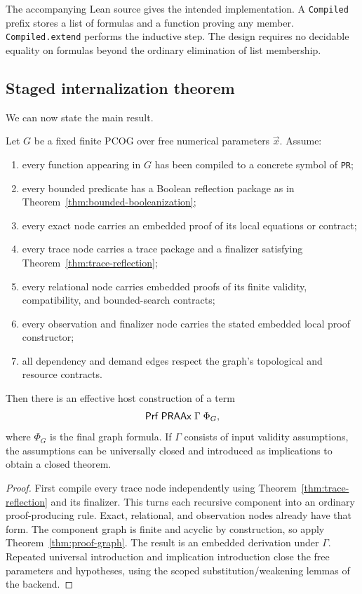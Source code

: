 The accompanying Lean source gives the intended implementation.  A
\texttt{Compiled} prefix stores a list of formulas and a function proving any
member.  \texttt{Compiled.extend} performs the inductive step.  The design
requires no decidable equality on formulas beyond the ordinary elimination of
list membership.

\subsection{Staged internalization theorem}

We can now state the main result.

\begin{theorem}
\label{thm:staged-internalization}
Let \(G\) be a fixed finite PCOG over free numerical parameters \(\vec x\).
Assume:
\begin{enumerate}
\item every function appearing in \(G\) has been compiled to a concrete
symbol of \texttt{PR};
\item every bounded predicate has a Boolean reflection package as in
Theorem~\ref{thm:bounded-booleanization};
\item every exact node carries an embedded proof of its local equations or
contract;
\item every trace node carries a trace package and a finalizer satisfying
Theorem~\ref{thm:trace-reflection};
\item every relational node carries embedded proofs of its finite validity,
compatibility, and bounded-search contracts;
\item every observation and finalizer node carries the stated embedded local
proof constructor;
\item all dependency and demand edges respect the graph's topological and
resource contracts.
\end{enumerate}
Then there is an effective host construction of a term
\[
  \mathsf{Prf}\;\mathsf{PRAAx}\;\Gamma\;\Phi_G,
\]
where \(\Phi_G\) is the final graph formula.  If \(\Gamma\) consists of input
validity assumptions, the assumptions can be universally closed and introduced
as implications to obtain a closed theorem.
\end{theorem}

\begin{proof}
First compile every trace node independently using
Theorem~\ref{thm:trace-reflection} and its finalizer.  This turns each recursive
component into an ordinary proof-producing rule.  Exact, relational, and
observation nodes already have that form.  The component graph is finite and
acyclic by construction, so apply Theorem~\ref{thm:proof-graph}.  The result is
an embedded derivation under \(\Gamma\).  Repeated universal introduction and
implication introduction close the free parameters and hypotheses, using the
scoped substitution/weakening lemmas of the backend.
\end{proof}

